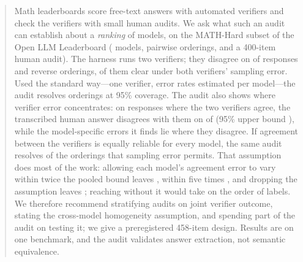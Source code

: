 \begin{abstract}
Math leaderboards score free-text answers with automated verifiers and check
the verifiers with small human audits. We ask what such an audit can
establish about a \emph{ranking} of models, on the MATH-Hard subset of the
Open LLM Leaderboard (\nNModels{} models, \nNPairs{} pairwise orderings, and a
400-item human audit). The harness runs two verifiers; they disagree on
\nDisRate{} of \nNRows{} responses and reverse \nScorerFlips{} orderings,
\nScorerFlipsSig{} of them clear under both verifiers' sampling error. Used the
standard way---one verifier, error rates estimated per model---the audit
resolves \nSingleComb{} orderings at 95\% coverage. The audit also shows where
verifier error concentrates: on responses where the two verifiers agree, the
transcribed human answer disagrees with them on \nConcErr{} of \nConcN{}
(95\% upper bound \nConcUpper), while the model-specific errors it finds lie
where they disagree. If agreement between the verifiers is equally reliable
for every model, the same audit resolves \nJointComb{} of the \nCeiling{}
orderings that sampling error permits. That assumption does most of the work:
allowing each model's agreement error to vary within twice the pooled bound
leaves \nHetTwo, within five times \nHetFive, and dropping the assumption
leaves \nNoPool; reaching \nJointComb{} without it would take on the order of
\nNPLabelsFull{} labels. We therefore recommend stratifying audits on joint
verifier outcome, stating the cross-model homogeneity assumption, and spending
part of the audit on testing it; we give a preregistered 458-item design.
Results are on one benchmark, and the audit validates answer extraction, not
semantic equivalence.
\end{abstract}
